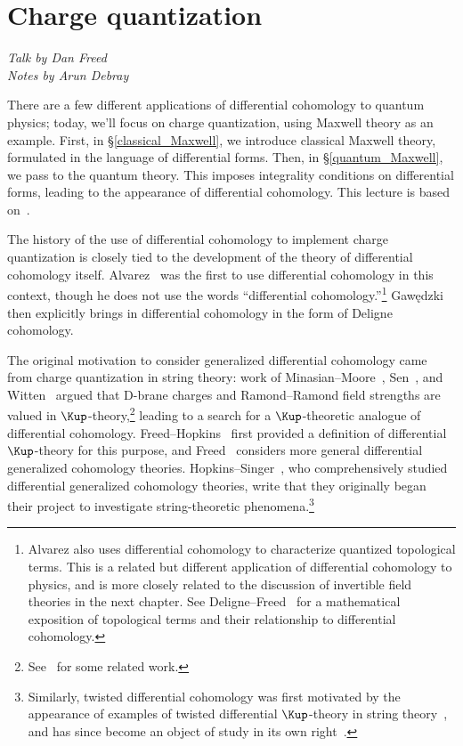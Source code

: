 
\section{Charge quantization}
\textit{Talk by Dan Freed}\\
\textit{Notes by Arun Debray}
\label{field_theory}

There are a few different applications of differential cohomology to quantum physics; today, we'll focus on charge
quantization, using Maxwell theory as an example. First, in \S\ref{classical_Maxwell}, we introduce classical
Maxwell theory, formulated in the language of differential forms. Then, in \S\ref{quantum_Maxwell}, we pass to the
quantum theory. This imposes integrality conditions on differential forms, leading to the appearance of
differential cohomology. This lecture is based on~\cite[Part 3]{Fre02a}.

The history of the use of differential cohomology to implement charge quantization is closely tied to the
development of the theory of differential cohomology itself. Alvarez~\cite{Alv85} was the first to use
differential cohomology in this context, though he does not use the words ``differential
cohomology.''\footnote{Alvarez also uses differential cohomology to characterize quantized topological terms. This
is a related but different application of differential cohomology to physics, and is more closely related to the
discussion of invertible field theories in the next chapter. See Deligne--Freed~\cite[Chapter 6]{DF99} for a
mathematical exposition of topological terms and their relationship to differential cohomology.}
Gawędzki~\cite{Gaw88} then explicitly brings in differential cohomology in the form of Deligne cohomology.

The original motivation to consider generalized differential cohomology came from charge quantization in string
theory: work of Minasian--Moore~\cite{MM97}, Sen~\cite{Sen98}, and Witten~\cite{Wit98} argued that D-brane charges
and Ramond--Ramond field strengths are valued in $\Kup$-theory,\footnote{See~\cite{FW99, MW00, DMW02} for some
related work.} leading to a search for a $\Kup$-theoretic analogue of differential
cohomology. Freed--Hopkins~\cite{FH00}
first provided a definition of differential $\Kup$-theory for this purpose, and Freed~\cite{Fre00} considers more
general differential generalized cohomology theories. Hopkins--Singer~\cite{HopkinsSinger}, who comprehensively
studied differential generalized cohomology theories, write that they originally began their project to investigate
string-theoretic phenomena.\footnote{Similarly, twisted differential cohomology was first motivated by the
appearance of examples of twisted differential $\Kup$-theory in string theory~\cites[\S 5.3]{Wit98}{BV00}{Fre00},
and has since become an object of study in its own right~\cites[\S
4.1.2]{Urs}{GS18}{BN19}{GS19c}{GS19a}{GS19b}{FSS20d}.}

